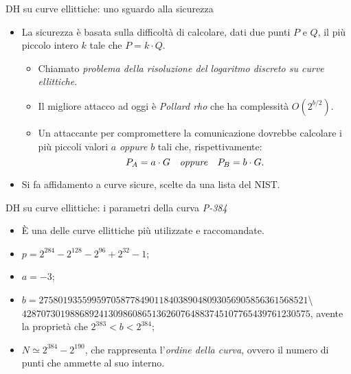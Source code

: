 \documentclass[11pt,svgnames,smaller,aspectratio=169,italian]{beamer}
\begin{document}
\begin{frame}{DH su curve ellittiche: uno sguardo alla sicurezza}
	\begin{itemize}
		\item La sicurezza è basata sulla difficoltà di calcolare, dati due punti $P$ e $Q$, il più piccolo intero $k$ tale che $P = k \cdot Q$.
			\begin{itemize}
				\item Chiamato \emph{problema della risoluzione del logaritmo discreto su curve ellittiche}.
				\item Il migliore attacco ad oggi è \emph{Pollard rho} che ha complessità $O(2^{b/2})$.
				\item Un attaccante per compromettere la comunicazione dovrebbe calcolare i più piccoli valori $a$ \emph{oppure} $b$ tali che, rispettivamente:
					\begin{equation*}
						P_{A} = a \cdot G	\quad\text{\emph{oppure}}	\quad P_{B} = b \cdot G.
					\end{equation*}
			\end{itemize}
		\item Si fa affidamento a curve sicure, scelte da una lista del NIST.
	\end{itemize}
\end{frame}

\begin{frame}{DH su curve ellittiche: i parametri della curva \emph{P-384}}
	\begin{itemize}
		\item È una delle curve ellittiche più utilizzate e raccomandate.
		\item $p = 2^{284} - 2^{128} - 2^{96} + 2^{32} - 1$;
		\item $a = -3$;
		\item $b =  27580193559959705877849011840389048093056905856361568521$\textbackslash \\
		$428707301988689241309860865136260764883745107765439761230575$, avente la proprietà che $2^{383} < b < 2^{384}$;
		 \item $N \simeq 2^{384} - 2^{190}$, che rappresenta l'\emph{ordine della curva}, ovvero il numero di punti che ammette al suo interno.
	\end{itemize}
\end{frame}
\end{document}
